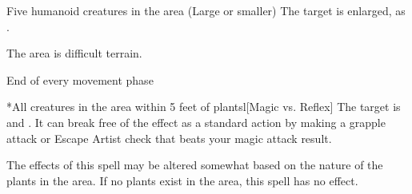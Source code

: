 \begin{spellheader}
    \spelldur{\durshort \dismissable}
\end{spellheader}
\begin{spelleffects}
    \begin{spelltarget}{Five humanoid creatures in the area (Large or smaller)}
        \spelleffect The target is enlarged, as .
    \end{spelltarget}
\end{spelleffects}

\begin{spellheader}
    \spelldur{\durshort \dismissable}
\end{spellheader}
\begin{spelleffects}
    \spelleffect The area is difficult terrain.
    \begin{spelltrigger}{End of every movement phase}
        \begin{spelltarget}*{All creatures in the area within 5 feet of plants}l[Magic vs. Reflex]
            \spellsuccess The target is \entangled and \immobilized. It can break free of the effect as a standard action by making a grapple attack or Escape Artist check that beats your magic attack result.
        \end{spelltarget}
    \end{spelltrigger}
\end{spelleffects}
\begin{spellfooter}
    \spellnotes The effects of this spell may be altered somewhat based on the nature of the plants in the area. If no plants exist in the area, this spell has no effect.
\end{spellfooter}

